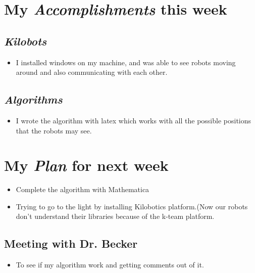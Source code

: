 \section{My \emph{Accomplishments} this week}

\subsection{\emph{Kilobots}}

\begin{itemize}
\item I installed windows on my machine, and was able to see robots moving around and also communicating with each other.
\end{itemize}

\subsection{\emph{Algorithms}}

\begin{itemize}
\item I wrote the algorithm with latex which works with all the possible positions that the robots may see.
\end{itemize}





\section{My \emph{Plan} for next week}

\begin{itemize}
\item Complete the algorithm with Mathematica
\item Trying to go to the light by installing Kilobotics platform.(Now our robots don't understand their libraries because of the k-team platform.
\end{itemize}

\subsection{Meeting with Dr. Becker  }

\begin{itemize}
\item To see if my algorithm work and getting comments out of it.
\end{itemize}


